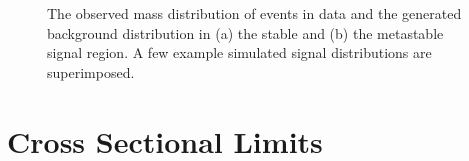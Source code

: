 \begin{figure}
\caption{The observed mass distribution of events in data and the generated background distribution in (a) the stable and (b) the metastable signal region. A few example simulated signal distributions are superimposed.}
\label{fig:signal_mass}
\end{figure}


\section{Cross Sectional Limits}

